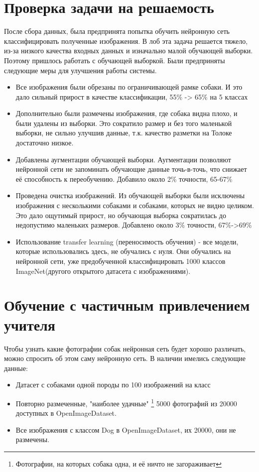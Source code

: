 \section{Проверка задачи на решаемость} \label{sect3_4}
После сбора данных, была предпринята попытка обучить нейронную сеть классифицировать полученные изображения. В лоб эта задача решается тяжело, из-за низкого качества входных данных и изначально малой обучающей выборки. Поэтому пришлось работать с обучающей выборкой. Были предприняты следующие меры для улучшения работы системы.
\begin{itemize}
    \item Все изображения были обрезаны по ограничивающей рамке собаки. И это дало сильный прирост в качестве классификации, 55\% -> 65\% на 5 классах
    \item Дополнительно были размечены изображения, где собака видна плохо, и были удалены из выборки. Это сократило размер и без того маленькой выборки, не сильно улучшив данные, т.к. качество разметки на Толоке достаточно низкое.
    \item Добавлены аугментации обучающей выборки. Аугментации позволяют нейронной сети не запоминать обучающие данные точь-в-точь, что снижает её способность к переобучению. Добавило около 2\% точности, 65-67\%
    \item Проведена очистка изображений. Из обучающей выборки были исключены изображения с несколькими собаками и собаками, которых не видно целиком. Это дало ощутимый прирост, но обучающая выборка сократилась до недопустимо маленьких размеров. Добавлено около 3\% точности, 67\%->69\%
    \item Использование transfer learning (переносимость обучения) - все модели, которые использовались здесь, не обучались с нуля. Они обучались на нейронной сети, уже предобученной классифицировать 1000 классов ImageNet(другого открытого датасета с изображениями).

\end{itemize}


\section{Обучение с частичным привлечением учителя} \label{sect3_3}
Чтобы узнать какие фотографии собак нейронная сеть будет хорошо различать, можно спросить об этом саму нейронную сеть.
В наличии имелись следующие данные:
\begin{itemize}
    \item Датасет с собаками одной породы по 100 изображений на класс
    \item Повторно размеченные, "наиболее удачные"
    \footnote{Фотографии, на которых собака одна, и её ничто не загораживает} 
    5000 фотографий из 20000 доступных в OpenImageDataset.
    \item Все изображения с классом Dog в OpenImageDataset, их 20000, они не размечены.
\end{itemize}

